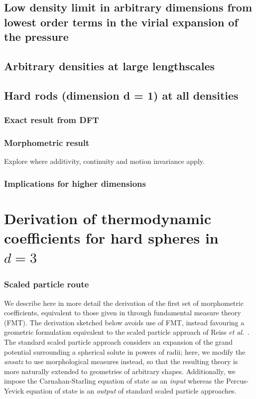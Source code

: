\documentclass[12pt]{report}
\begin{document}
\subsection{Low density limit in arbitrary dimensions from lowest order terms in the virial expansion of the pressure}
\subsection{Arbitrary densities at large lengthscales}
\subsection{Hard rods (dimension d = 1) at all densities}
\subsubsection{Exact result from DFT}
\subsubsection{Morphometric result}
Explore where additivity, continuity and motion invariance apply.
\subsubsection{Implications for higher dimensions}

\section{Derivation of thermodynamic coefficients for hard spheres in $d = 3$}

\subsubsection{Scaled particle route}

We describe here in more detail the derivation of the first set of morphometric coefficients, equivalent to those given in \cite{Hansen-Goos2006} through fundamental measure theory (FMT).
The derivation sketched below avoids use of FMT, instead favouring a geometric formulation equivalent to the scaled particle approach of Reiss \emph{et al}.\ \cite{Reiss1959,Reiss1960}.
The standard scaled particle approach considers an expansion of the grand potential surrounding a spherical solute in powers of radii; here, we modify the \emph{ansatz} to use morphological measures instead, so that the resulting theory is more naturally extended to geometries of arbitrary shapes.
Additionally, we impose the Carnahan-Starling equation of state as an \emph{input} whereas the Percus-Yevick equation of state is an \textit{output} of standard scaled particle approaches.
\end{document}
